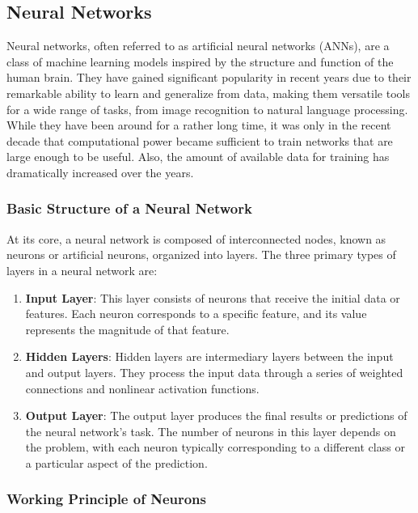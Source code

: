 \subsection{Neural Networks}
Neural networks, often referred to as artificial neural networks (ANNs), are a class of machine learning models inspired by the structure and function of the human brain. They have gained significant popularity in recent years due to their remarkable ability to learn and generalize from data, making them versatile tools for a wide range of tasks, from image recognition to natural language processing. While they have been around for a rather long time, it was only in the recent decade that computational power became sufficient to train networks that are large enough to be useful. Also, the amount of available data for training has dramatically increased over the years.

\subsubsection{Basic Structure of a Neural Network}

At its core, a neural network is composed of interconnected nodes, known as neurons or artificial neurons, organized into layers. The three primary types of layers in a neural network are:

\begin{enumerate}
	\item \textbf{Input Layer}: This layer consists of neurons that receive the initial data or features. Each neuron corresponds to a specific feature, and its value represents the magnitude of that feature.
	
	\item \textbf{Hidden Layers}: Hidden layers are intermediary layers between the input and output layers. They process the input data through a series of weighted connections and nonlinear activation functions.
	
	\item \textbf{Output Layer}: The output layer produces the final results or predictions of the neural network's task. The number of neurons in this layer depends on the problem, with each neuron typically corresponding to a different class or a particular aspect of the prediction.
\end{enumerate}

\subsubsection{Working Principle of Neurons}

